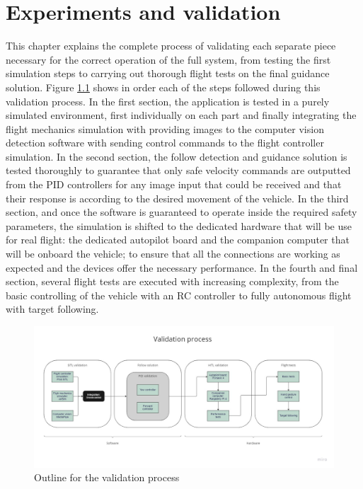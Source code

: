 \chapter{Experiments and validation}
\label{chap:validation}

This chapter explains the complete process of validating each separate piece necessary for the correct operation of the full system, from testing the first simulation steps to carrying out thorough flight tests on the final guidance solution.
Figure \ref{fig:validation-chart} shows in order each of the steps followed during this validation process.
In the first section, the application is tested in a purely simulated environment, first individually on each part and finally integrating the flight mechanics simulation 
 with providing images to the computer vision detection software with sending control commands to the flight controller simulation.
 In the second section, the follow detection and guidance solution is tested thoroughly to guarantee that only safe velocity commands are outputted from the PID controllers for any image input that could be received and that their response is according to the desired movement of the vehicle.
 In the third section, and once the software is guaranteed to operate inside the required safety parameters, the simulation is shifted to the dedicated hardware that will be use for real flight: the dedicated autopilot board and the companion computer that will be onboard the vehicle; to ensure that all the connections are working as expected and the devices offer the necessary performance.
 In the fourth and final section, several flight tests are executed with increasing complexity, from the basic controlling of the vehicle with an RC controller to fully autonomous flight with target following.

\begin{figure}
  \centering
  \includegraphics[width=\textwidth, keepaspectratio]{img/validation-chart.jpg}
  \caption{Outline for the validation process}\label{fig:validation-chart}
\end{figure}

